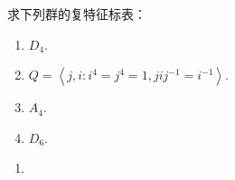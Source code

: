 \documentclass{ctexart}
\newif\ifpreface
\begin{document}
\large
\setlength{\baselineskip}{1.2em}
\ifpreface
    
\newgeometry{left=2cm,right=2cm,top=2cm,bottom=2cm}
\else
{}
\maketitle
\fi
\begin{problem}
  求下列群的复特征标表：
  \begin{enumerate}
    \item \(D_4\).
    \item \(Q=\left\langle j,i:i^4=j^4=1,jij^{-1}=i^{-1}\right\rangle \). 
    \item \(A_4\).
    \item \(D_6\). 
  \end{enumerate}
\end{problem}

\begin{solution}
  \begin{enumerate}
    \item 
  \end{enumerate}
\end{solution}
\end{document}
